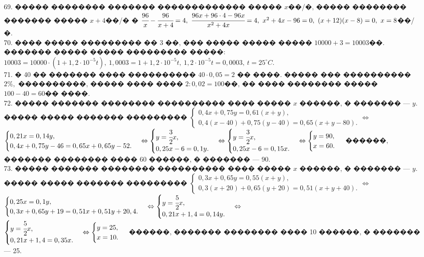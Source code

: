 \documentclass[12pt]{article}
\begin{document}
69. ����� �������� ������� ������������� ����� $x$��/�, ����� �������� ������� ����� $x+4$��/� � $\cfrac{96}{x}-\cfrac{96}{x+4}=4,\ \cfrac{96x+96\cdot4-96x}{x^2+4x}=4,\ x^2+4x-96=0,\ (x+12)(x-8)=0,\ x=8$��/�.\\
70. ���� ����� ��������� �� 3 ��, ��� ����� ����� ����� $10000+3=10003$��. ������� ����� ����� ��������� �����: $10003=10000\cdot(1+1,2\cdot10^{-5}t),\
1,0003=1+1,2\cdot10^{-5}t,\ 1,2\cdot10^{-5}t=0,0003,\ t=25^\circ C.$\\
71. � 40 �� ������� ���� ���������� $40\cdot0,05=2$ �� ����. ����� ��� ���������� $2\%,$ ����������, ����� ���� ���� $2:0,02=100$��, �� ���� �������� ����� $100-40=60$�� ����.\\
72. ����� ������� �������� ���������� ���� ����� $x$ ������, � ������� --- $y.$ ����� ����� ������� ��������� $\begin{cases} 0,4x+0,75y=0,61(x+y),\\
0,4(x-40)+0,75(y-40)=0,65(x+y-80).\end{cases}\Leftrightarrow$\\$\begin{cases} 0,21x=0,14y,\\
0,4x+0,75y-46=0,65x+0,65y-52.\end{cases}\Leftrightarrow\begin{cases} y=\cfrac{3}{2}x,\\
0,25x-6=0,1y.\end{cases}\Leftrightarrow\begin{cases} y=\cfrac{3}{2}x,\\
0,25x-6=0,15x.\end{cases}\Leftrightarrow\begin{cases} y=90,\\
x=60.\end{cases}$ ������, ������� �������� ���� 60 ������, � ������� --- 90.\\
73. ����� ������� �������� ���������� ���� ����� $x$ ������, � ������� --- $y.$ ����� ����� ������� ��������� $\begin{cases} 0,3x+0,65y=0,55(x+y),\\
0,3(x+20)+0,65(y+20)=0,51(x+y+40).\end{cases}\Leftrightarrow$\\$\begin{cases} 0,25x=0,1y,\\
0,3x+0,65y+19=0,51x+0,51y+20,4.\end{cases}\Leftrightarrow\begin{cases} y=\cfrac{5}{2}x,\\
0,21x+1,4=0,14y.\end{cases}\Leftrightarrow$\\$\begin{cases} y=\cfrac{5}{2}x,\\
0,21x+1,4=0,35x.\end{cases}\Leftrightarrow\begin{cases} y=25,\\
x=10.\end{cases}$ ������, ������� �������� ���� 10 ������, � ������� --- 25.\\
\end{document}
